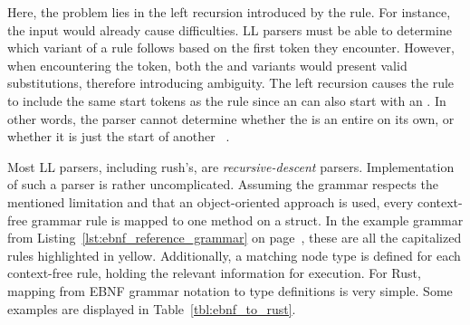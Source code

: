 
Here, the problem lies in the left recursion introduced by the  rule.
For instance, the input  would already cause difficulties.
LL parsers must be able to determine which variant of a rule follows based on the first token they encounter.
However, when encountering the  token, both the  and  variants would present valid substitutions, therefore introducing ambiguity.
The left recursion causes the  rule to include the same start tokens as the  rule since an  can also start with an .
In other words, the parser cannot determine whether the  is an entire  on its own, or whether it is just the start of another ~\cite[p.~85]{Watson2017}.

Most LL parsers, including rush's, are \emph{recursive-descent} parsers.
Implementation of such a parser is rather uncomplicated.
Assuming the grammar respects the mentioned limitation and that an object-oriented approach is used, every context-free grammar rule is mapped to one method on a  struct.
In the example grammar from Listing~\ref{lst:ebnf_reference_grammar} on page~\pageref{lst:ebnf_reference_grammar}, these are all the capitalized rules highlighted in yellow.
Additionally, a matching node type is defined for each context-free rule, holding the relevant information for execution.
For Rust, mapping from EBNF grammar notation to type definitions is very simple.
Some examples are displayed in Table~\ref{tbl:ebnf_to_rust}.

